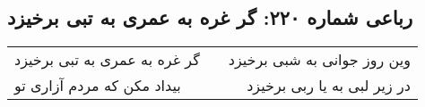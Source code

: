 \begin{center}
\section*{رباعی شماره ۲۲۰: گر غره به عمری به تبی برخیزد}
\label{sec:sh220}
\begin{longtable}{l p{0.5cm} r}
گر غره به عمری به تبی برخیزد
&&
وین روز جوانی به شبی برخیزد
\\
بیداد مکن که مردم آزاری تو
&&
در زیر لبی به یا ربی برخیزد
\\
\end{longtable}
\end{center}
